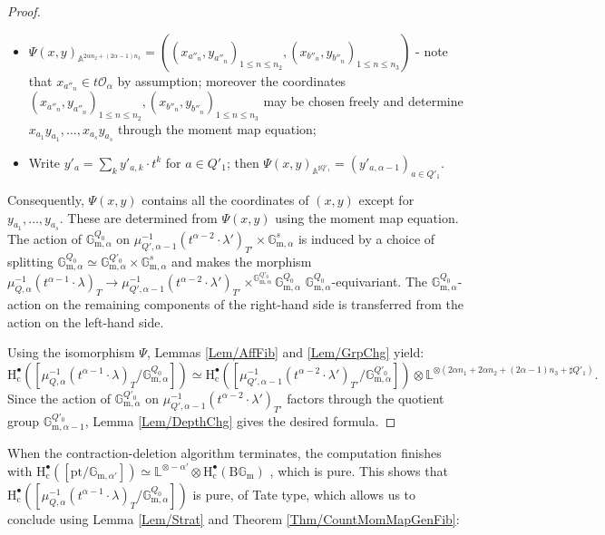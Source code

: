 \documentclass[11pt,english]{article}
\numberwithin{equation}{section}
\numberwithin{figure}{section}
\theoremstyle{definition}
\theoremstyle{plain}
\theoremstyle{remark}
\newcommand\rr{\mathbf{r}}
\newcommand\HH{\mathrm{H}}
\begin{document}
\begin{proof}
\begin{itemize}
as $\rr=\underline{1}$;
\item $\Psi(x,y)_{\mathbb{A}^{2\alpha n_{2}+(2\alpha-1)n_{3}}}=\left((x_{a''_{n}},y_{a''_{n}})_{1\leq n\leq n_{2}},(x_{b''_{n}},y_{b''_{n}})_{1\leq n\leq n_{3}}\right)$
- note that $x_{a''_{n}}\in t\mathcal{O}_{\alpha}$ by assumption;
moreover the coordinates $(x_{a''_{n}},y_{a''_{n}})_{1\leq n\leq n_{2}},(x_{b''_{n}},y_{b''_{n}})_{1\leq n\leq n_{3}}$
may be chosen freely and determine $x_{a_{1}}y_{a_{1}},\ldots,x_{a_{s}}y_{a_{s}}$
through the moment map equation;
\item Write $y'_{a}=\sum_{k}y'_{a,k}\cdot t^{k}$ for $a\in Q'_{1}$; then
$\Psi(x,y)_{\mathbb{A}^{\sharp Q'_{1}}}=(y'_{a,\alpha-1})_{a\in Q'_{1}}$.
\end{itemize}
Consequently, $\Psi(x,y)$ contains all the coordinates of $(x,y)$
except for $y_{a_{1}},\ldots,y_{a_{s}}$. These are determined from
$\Psi(x,y)$ using the moment map equation. The action of $\mathbb{G}_{\mathrm{m},\alpha}^{Q_{0}}$
on $\mu_{Q',\alpha-1}^{-1}(t^{\alpha-2}\cdot\lambda')_{T'}\times\mathbb{G}_{\mathrm{m},\alpha}^{s}$
is induced by a choice of splitting $\mathbb{G}_{\mathrm{m},\alpha}^{Q_{0}}\simeq\mathbb{G}_{\mathrm{m},\alpha}^{Q'_{0}}\times\mathbb{G}_{\mathrm{m},\alpha}^{s}$
and makes the morphism $\mu_{Q,\alpha}^{-1}(t^{\alpha-1}\cdot\lambda)_{T}\rightarrow\mu_{Q',\alpha-1}^{-1}(t^{\alpha-2}\cdot\lambda')_{T'}\times^{\mathbb{G}_{\mathrm{m},\alpha}^{Q'_{0}}}\mathbb{G}_{\mathrm{m},\alpha}^{Q_{0}}$
$\mathbb{G}_{\mathrm{m},\alpha}^{Q_{0}}$-equivariant. The $\mathbb{G}_{\mathrm{m},\alpha}^{Q_{0}}$-action
on the remaining components of the right-hand side is transferred
from the action on the left-hand side.

Using the isomorphism $\Psi$, Lemmas \ref{Lem/AffFib} and \ref{Lem/GrpChg}
yield:\[
\HH_{\mathrm{c}}^{\bullet}\left(\left[\mu_{Q,\alpha}^{-1}(t^{\alpha-1}\cdot\lambda)_T/\mathbb{G}_{\mathrm{m},\alpha}^{Q_{0}}\right]\right)
\simeq
\HH_{\mathrm{c}}^{\bullet}\left(\left[\mu_{Q',\alpha-1}^{-1}(t^{\alpha-2}\cdot\lambda')_{T'}/\mathbb{G}_{\mathrm{m},\alpha}^{Q'_{0}}\right]\right)
\otimes\mathbb{L}^{\otimes\left(2\alpha n_1+2\alpha n_2+(2\alpha-1)n_3+\sharp Q'_1\right)}.
\] Since the action of $\mathbb{G}_{\mathrm{m},\alpha}^{Q'_{0}}$ on
$\mu_{Q',\alpha-1}^{-1}(t^{\alpha-2}\cdot\lambda')_{T'}$ factors
through the quotient group $\mathbb{G}_{\mathrm{m},\alpha-1}^{Q'_{0}}$,
Lemma \ref{Lem/DepthChg} gives the desired formula. \end{proof}

When the contraction-deletion algorithm terminates, the computation
finishes with $\HH_{\mathrm{c}}^{\bullet}\left(\left[\mathrm{pt}/\mathbb{G}_{\mathrm{m},\alpha'}\right]\right)\simeq\mathbb{L}^{\otimes-\alpha'}\otimes\HH_{\mathrm{c}}^{\bullet}\left(\mathrm{B}\mathbb{G}_{\mathrm{m}}\right)$
, which is pure. This shows that $\HH_{\mathrm{c}}^{\bullet}\left(\left[\mu_{Q,\alpha}^{-1}(t^{\alpha-1}\cdot\lambda)_{T}/\mathbb{G}_{\mathrm{m},\alpha}^{Q_{0}}\right]\right)$
is pure, of Tate type, which allows us to conclude using Lemma \ref{Lem/Strat}
and Theorem \ref{Thm/CountMomMapGenFib}:
\end{document}
